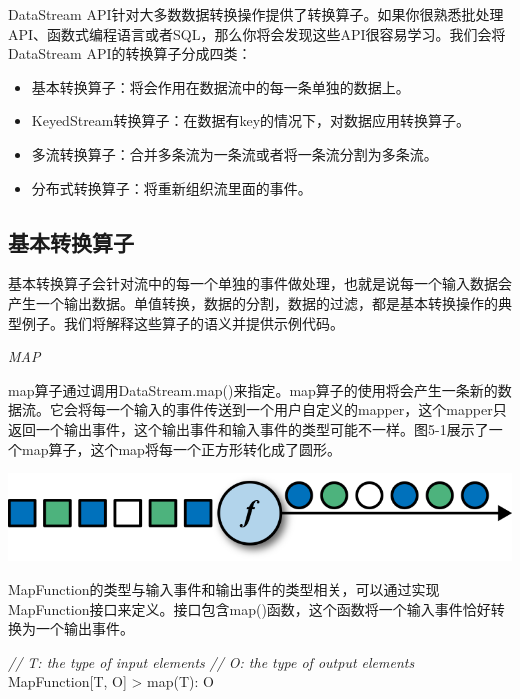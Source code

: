 \documentclass[cn,11pt,chinese]{elegantbook}
\newenvironment{Shaded}{}{}
\newcommand{\CommentTok}[1]{\textcolor[rgb]{0.38,0.63,0.69}{\textit{#1}}}
\newcommand{\FunctionTok}[1]{\textcolor[rgb]{0.02,0.16,0.49}{#1}}
\newcommand{\NormalTok}[1]{#1}
\providecommand{\tightlist}{%
  \setlength{\itemsep}{0pt}\setlength{\parskip}{0pt}}
\begin{document}
DataStream
API针对大多数数据转换操作提供了转换算子。如果你很熟悉批处理API、函数式编程语言或者SQL，那么你将会发现这些API很容易学习。我们会将DataStream
API的转换算子分成四类：

\begin{itemize}
\tightlist
\item
  基本转换算子：将会作用在数据流中的每一条单独的数据上。
\item
  KeyedStream转换算子：在数据有key的情况下，对数据应用转换算子。
\item
  多流转换算子：合并多条流为一条流或者将一条流分割为多条流。
\item
  分布式转换算子：将重新组织流里面的事件。
\end{itemize}

\hypertarget{ux57faux672cux8f6cux6362ux7b97ux5b50}{%
\subsection{基本转换算子}\label{ux57faux672cux8f6cux6362ux7b97ux5b50}}

基本转换算子会针对流中的每一个单独的事件做处理，也就是说每一个输入数据会产生一个输出数据。单值转换，数据的分割，数据的过滤，都是基本转换操作的典型例子。我们将解释这些算子的语义并提供示例代码。

\emph{MAP}

map算子通过调用DataStream.map()来指定。map算子的使用将会产生一条新的数据流。它会将每一个输入的事件传送到一个用户自定义的mapper，这个mapper只返回一个输出事件，这个输出事件和输入事件的类型可能不一样。图5-1展示了一个map算子，这个map将每一个正方形转化成了圆形。

\includegraphics{images/spaf_0501.png}

MapFunction的类型与输入事件和输出事件的类型相关，可以通过实现MapFunction接口来定义。接口包含map()函数，这个函数将一个输入事件恰好转换为一个输出事件。

\begin{Shaded}
\begin{Highlighting}[]
\CommentTok{// T: the type of input elements}
\CommentTok{// O: the type of output elements}
\NormalTok{MapFunction[T, O]}
\NormalTok{    \textgreater{} }\FunctionTok{map}\NormalTok{(T): O}
\end{Highlighting}
\end{Shaded}
\end{document}

